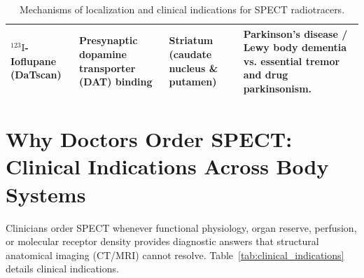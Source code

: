 \documentclass[11pt,a4paper]{article}
\begin{document}
\begin{table}[htbp]
\begin{tabular}{p{3.5cm}p{3.2cm}p{3.2cm}p{5.5cm}}
\textbf{$^{123}\text{I}$-Ioflupane (DaTscan)} & Presynaptic dopamine transporter (DAT) binding & Striatum (caudate nucleus \& putamen) & Parkinson's disease / Lewy body dementia vs. essential tremor and drug parkinsonism. \\
\bottomrule
\end{tabular}
\caption{Mechanisms of localization and clinical indications for SPECT radiotracers.}
\label{tab:mechanisms}
\end{table}

\section{Why Doctors Order SPECT: Clinical Indications Across Body Systems}

Clinicians order SPECT whenever functional physiology, organ reserve, perfusion, or molecular receptor density provides diagnostic answers that structural anatomical imaging (CT/MRI) cannot resolve. Table~\ref{tab:clinical_indications} details clinical indications.
\end{document}

